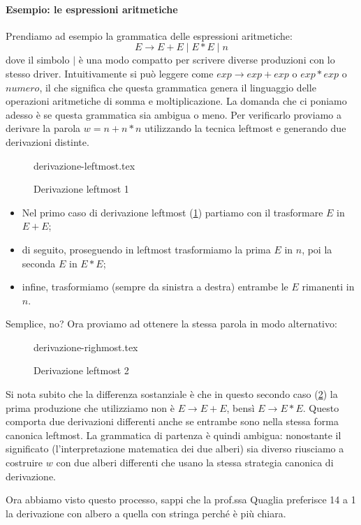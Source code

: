 \documentclass[class=book, crop=false, oneside, 12pt]{standalone}
\begin{document}
\paragraph{Esempio: le espressioni aritmetiche}
Prendiamo ad esempio la grammatica delle espressioni aritmetiche:
\begin{equation}
    E \to E+E \mid E*E \mid  n
\end{equation}
dove il simbolo \(\mid\) è una modo compatto per scrivere diverse produzioni con lo stesso driver. Intuitivamente si può leggere come \(exp \to exp+exp\)  o  \(exp*exp\)  o  \(numero\), il che significa che questa grammatica genera il linguaggio delle operazioni aritmetiche di somma e moltiplicazione. La domanda che ci poniamo adesso è se questa grammatica sia ambigua o meno. Per verificarlo proviamo a derivare la parola \(w = n+n*n\) utilizzando la tecnica leftmost e generando due derivazioni distinte.
\begin{figure}[H]
	\centering
	{derivazione-leftmost.tex}
    \caption{Derivazione leftmost 1}
    \label{leftmost_1}
\end{figure}
\begin{itemize}
    \item Nel primo caso di derivazione leftmost (\ref{leftmost_1}) partiamo con il trasformare \(E\) in \(E+E\);
    \item di seguito, proseguendo in leftmost trasformiamo la prima \(E\) in \(n\), poi la seconda \(E\) in \(E*E\);
    \item infine, trasformiamo (sempre da sinistra a destra) entrambe le \(E\) rimanenti in \(n\).
\end{itemize}
Semplice, no? Ora proviamo ad ottenere la stessa parola in modo alternativo:
\begin{figure}[H]
	\centering
	{derivazione-righmost.tex}
    \caption{Derivazione leftmost 2}
    \label{leftmost_2}
\end{figure}
Si nota subito che la differenza sostanziale è che in questo secondo caso (\ref{leftmost_2}) la prima produzione che utilizziamo non è \(E \to E+E\), bensì \(E \to E*E\). Questo comporta due derivazioni differenti anche se entrambe sono nella stessa forma canonica leftmost.
La grammatica di partenza è quindi ambigua: nonostante il significato (l'interpretazione matematica dei due alberi) sia diverso riusciamo a costruire \(w\) con due alberi differenti che usano la stessa strategia canonica di derivazione.

Ora abbiamo visto questo processo, sappi che la prof.ssa Quaglia preferisce 14 a 1 la derivazione con albero a quella con stringa perché è più chiara.
\end{document}
